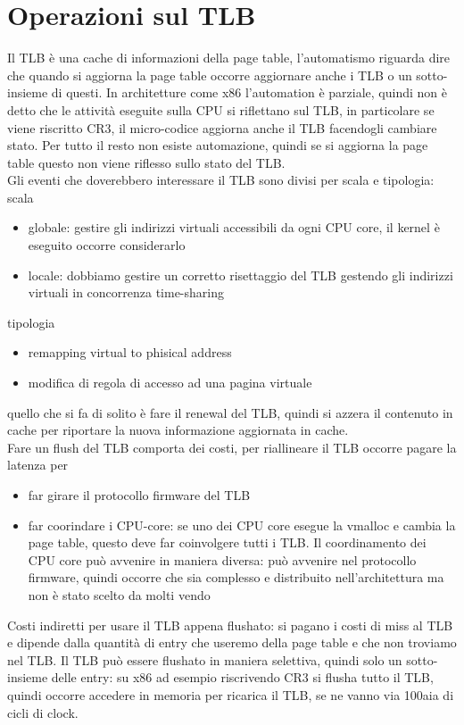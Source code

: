 \documentclass[12pt, oneside]{extbook}
\begin{document}
\section{Operazioni sul TLB}
Il TLB è una cache di informazioni della page table, l'automatismo riguarda dire che quando si aggiorna la page table occorre aggiornare anche i TLB o un sotto-insieme di questi. In architetture come x86 l'automation è parziale, quindi non è detto che le attività eseguite sulla CPU si riflettano sul TLB, in particolare se viene riscritto CR3, il micro-codice aggiorna anche il TLB facendogli cambiare stato. Per tutto il resto non esiste automazione, quindi se si aggiorna la page table questo non viene riflesso sullo stato del TLB.\\Gli eventi che doverebbero interessare il TLB sono divisi per scala e tipologia:
scala
\begin{itemize}
\item globale: gestire gli indirizzi virtuali accessibili da ogni CPU core, il kernel è eseguito occorre considerarlo
\item locale: dobbiamo gestire un corretto risettaggio del TLB gestendo gli indirizzi virtuali in concorrenza time-sharing
\end{itemize}
tipologia
\begin{itemize}
\item remapping virtual to phisical address
\item modifica di regola di accesso ad una pagina virtuale
\end{itemize}
quello che si fa di solito è fare il renewal del TLB, quindi si azzera il contenuto in cache per riportare la nuova informazione aggiornata in cache.\\ Fare un flush del TLB comporta dei costi, per riallineare il TLB occorre pagare la latenza per
\begin{itemize}
\item far girare il protocollo firmware del TLB
\item far coorindare i CPU-core: se uno dei CPU core esegue la vmalloc e cambia la page table, questo deve far coinvolgere tutti i TLB. Il coordinamento dei CPU core può avvenire in maniera diversa: può avvenire nel protocollo firmware, quindi occorre che sia complesso e distribuito nell'architettura ma non è stato scelto da molti vendo
\end{itemize}
Costi indiretti per usare il TLB appena flushato: si pagano i costi di miss al TLB e dipende dalla quantità di entry che useremo della page table e che non troviamo nel TLB. Il TLB può essere flushato in maniera selettiva, quindi solo un sotto-insieme delle entry: su x86 ad esempio riscrivendo CR3 si flusha tutto il TLB, quindi occorre accedere in memoria per ricarica il TLB, se ne vanno via 100aia di cicli di clock.
\end{document}
